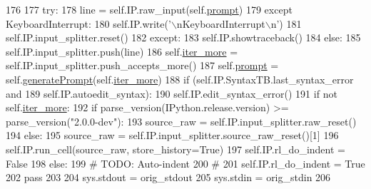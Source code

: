\begin{DoxyCode}
176 
177     \textcolor{keywordflow}{try}:
178       line = self.IP.raw\_input(self.\hyperlink{classvisualizer_1_1ipython__view_1_1IterableIPShell_a74c8888e64b8cf2d864493d75ba5ebca}{prompt})
179     \textcolor{keywordflow}{except} KeyboardInterrupt:
180       self.IP.write(\textcolor{stringliteral}{'\(\backslash\)nKeyboardInterrupt\(\backslash\)n'})
181       self.IP.input\_splitter.reset()
182     \textcolor{keywordflow}{except}:
183       self.IP.showtraceback()
184     \textcolor{keywordflow}{else}:
185       self.IP.input\_splitter.push(line)
186       self.\hyperlink{classvisualizer_1_1ipython__view_1_1IterableIPShell_a672c44aacaf26dd57d01b7ec982c830b}{iter\_more} = self.IP.input\_splitter.push\_accepts\_more()
187       self.\hyperlink{classvisualizer_1_1ipython__view_1_1IterableIPShell_a74c8888e64b8cf2d864493d75ba5ebca}{prompt} = self.\hyperlink{classvisualizer_1_1ipython__view_1_1IterableIPShell_ab3757cf663f77f0ec3c791e815ed21d4}{generatePrompt}(self.\hyperlink{classvisualizer_1_1ipython__view_1_1IterableIPShell_a672c44aacaf26dd57d01b7ec982c830b}{iter\_more})
188       \textcolor{keywordflow}{if} (self.IP.SyntaxTB.last\_syntax\_error \textcolor{keywordflow}{and}
189           self.IP.autoedit\_syntax):
190           self.IP.edit\_syntax\_error()
191       \textcolor{keywordflow}{if} \textcolor{keywordflow}{not} self.\hyperlink{classvisualizer_1_1ipython__view_1_1IterableIPShell_a672c44aacaf26dd57d01b7ec982c830b}{iter\_more}:
192           \textcolor{keywordflow}{if} parse\_version(IPython.release.version) >= parse\_version(\textcolor{stringliteral}{"2.0.0-dev"}):
193             source\_raw = self.IP.input\_splitter.raw\_reset()
194           \textcolor{keywordflow}{else}:
195             source\_raw = self.IP.input\_splitter.source\_raw\_reset()[1]
196           self.IP.run\_cell(source\_raw, store\_history=\textcolor{keyword}{True})
197           self.IP.rl\_do\_indent = \textcolor{keyword}{False}
198       \textcolor{keywordflow}{else}:
199           \textcolor{comment}{# TODO: Auto-indent}
200           \textcolor{comment}{#}
201           self.IP.rl\_do\_indent = \textcolor{keyword}{True}
202           \textcolor{keywordflow}{pass}
203 
204     sys.stdout = orig\_stdout
205     sys.stdin = orig\_stdin
206 
\end{DoxyCode}
